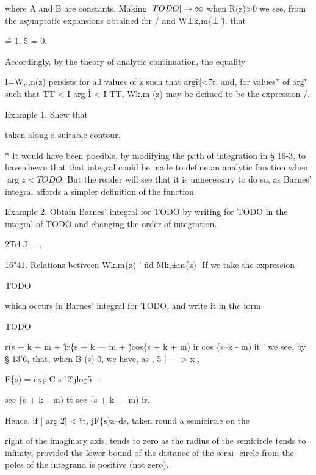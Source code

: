 where A and B are constants. Making $\left| TODO \right| \rightarrow \infty$
when R(z)>0 we see, from the asymptotic expansions obtained for / and
W±k,m\{± \^). that

\^ = 1, 5 = 0.

Accordingly, by the theory of analytic continuation, the equality

I=W,,,n(z) persists for all values of z such that arg\^r|<7r; and, for
values* of arg\^' such that TT < I arg \^ I < I TT, Wk,m (z) may be
defined to be the expression /.

Example 1. Shew that

taken along a suitable contour.

* It would have been possible, by modifying the path of integration in
§ 16-3, to have shewn that that integral could be made to define an
analytic function when $\arg z < TODO$. But the reader will see that
it is unnecessary to do so, as Barnes' integral affords a simpler
definition of the function.



%
%



Example 2. Obtain Barnes' integral for TODO by writing for TODO in the
integral of TODO and changing the order of integration.



2Trl J \_ ,



16"41. Relations betiveen Wk,m\{z) '-\^nd Mk,±m\{z)- If we take the
expression

TODO

which occurs in Barnes' integral for TODO. and write it in the form

TODO

r(s + k + m + \^)r\{s + k — m + \^)cos\{s + k + m) ir cos \{s--k - m)
it ' we see, by § 13'6, that, when B (s) \^ 0, we have, as , 5 | — > x
,



F\{s) = exp|C-s-\^-2\^'jlog5 +



sec \{s + k -- m) tt sec \{s + k — m) ir.



Hence, if | arg 2\^ | < \^ tt, jF\{s)z--ds, taken round a semicircle
on the

right of the imaginary axis, tends to zero as the radius of the
semicircle tends to infinity, provided the lower bound of the distance
of the serai- circle from the poles of the integrand is positive (not
zero).

